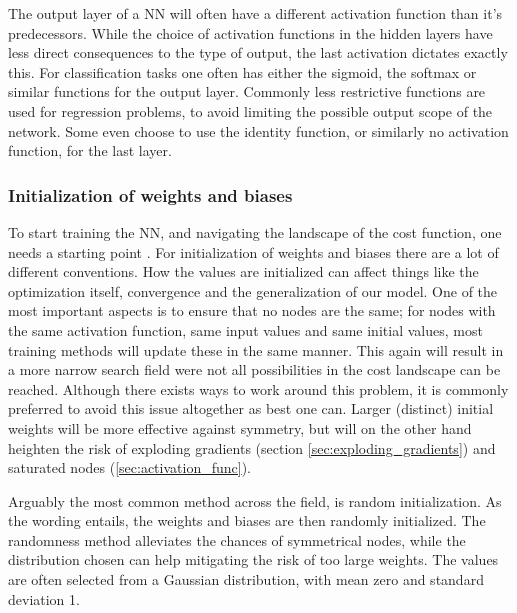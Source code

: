 The output layer of a NN will often have a different activation function than it's predecessors. While the choice of activation functions in the hidden layers have less direct consequences to the type of output, the last activation dictates exactly this. For classification tasks one often has either the sigmoid, the softmax or similar functions for the output layer. Commonly less restrictive functions are used for regression problems, to avoid limiting the possible output scope of the network. Some even choose to use the identity function, or similarly no activation function, for the last layer. 

\subsubsection{Initialization of weights and biases}\label{sec:NN_init}

To start training the NN, and navigating the landscape of the cost function, one needs a starting point \citep[p.297]{Goodfellow-et-al-2016}. For initialization of weights and biases there are a lot of different conventions. How the values are initialized can affect things like the optimization itself, convergence and the generalization of our model. 
One of the most important aspects is to ensure that no nodes are the same; for nodes with the same activation function, same input values and same initial values, most training methods will update these in the same manner. This again will result in a more narrow search field were not all possibilities in the cost landscape can be reached. Although there exists ways to work around this problem, it is commonly preferred to avoid this issue altogether as best one can. 
Larger (distinct) initial weights will be more effective against symmetry, but will on the other hand heighten the risk of exploding gradients (section \ref{sec:exploding_gradients}) and saturated nodes (\ref{sec:activation_func}). 

Arguably the most common method across the field, is random initialization. As the wording entails, the weights and biases are then randomly initialized. The randomness method alleviates the chances of symmetrical nodes, while the distribution chosen can help mitigating the risk of too large weights. The values are often selected from a Gaussian distribution, with mean zero and standard deviation 1. 

